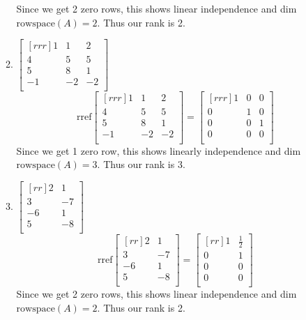 \documentclass[12pt]{article}
\begin{document}
\begin{enumerate}
\begin{enumerate}
	Since we get 2 zero rows, this shows linear independence and dim $\mathrm{rowspace}(A)=2$. Thus our rank is 2.
	\item $\begin{bmatrix}[rrr]1&1&2\\4&5&5\\5&8&1\\-1&-2&-2\\\end{bmatrix}$
	\[ \mathrm{rref}\begin{bmatrix}[rrr]1&1&2\\4&5&5\\5&8&1\\-1&-2&-2\\\end{bmatrix} = \begin{bmatrix}[rrr]1&0&0\\0&1&0\\0&0&1\\0&0&0\\\end{bmatrix} \]
	Since we get 1 zero row, this shows linearly independence and dim $\mathrm{rowspace}(A)=3$. Thus our rank is 3.
	\item $\begin{bmatrix}[rr]2&1\\3&-7\\-6&1\\5&-8\\\end{bmatrix}$
	\[ \mathrm{rref}\begin{bmatrix}[rr]2&1\\3&-7\\-6&1\\5&-8\\\end{bmatrix} = \begin{bmatrix}[rr]1&\frac{1}{2}\\0&1\\0&0\\0&0\\\end{bmatrix} \]
	Since we get 2 zero rows, this shows linear independence and dim $\mathrm{rowspace}(A)=2$. Thus our rank is 2.
	\end{enumerate}


\end{enumerate}
\end{document}
